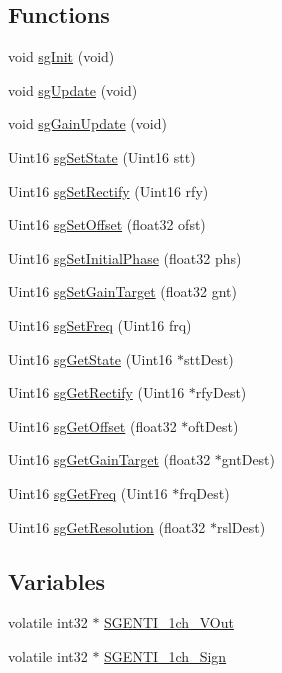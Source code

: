 \subsection*{Functions}
\begin{DoxyCompactItemize}
\item 
void \hyperlink{a00032_a41e810f7181a4ecaa5bc5f0713c6db89}{sg\-Init} (void)
\item 
void \hyperlink{a00032_a4ad7c6eca0c2bcdadaa81dd3fbb9df4b}{sg\-Update} (void)
\item 
void \hyperlink{a00032_a9d1f773315008eac3fc68486f3c9b02a}{sg\-Gain\-Update} (void)
\item 
Uint16 \hyperlink{a00032_a4da3578fed6e04e782a037a270ebde65}{sg\-Set\-State} (Uint16 stt)
\item 
Uint16 \hyperlink{a00032_a663b333309e306b76cc538d8b057ca7d}{sg\-Set\-Rectify} (Uint16 rfy)
\item 
Uint16 \hyperlink{a00032_ac4fa27b2a1e42815c53a9c41aea39dae}{sg\-Set\-Offset} (float32 ofst)
\item 
Uint16 \hyperlink{a00032_ac0b4e573457d4a6e3102c17ec9c3281a}{sg\-Set\-Initial\-Phase} (float32 phs)
\item 
Uint16 \hyperlink{a00032_a1352efb3adb6289a295afa3961d4a352}{sg\-Set\-Gain\-Target} (float32 gnt)
\item 
Uint16 \hyperlink{a00032_a3be6fb433900f4d91074b337ea3dba58}{sg\-Set\-Freq} (Uint16 frq)
\item 
Uint16 \hyperlink{a00032_ab720e3168a284abe388edf230705e4b4}{sg\-Get\-State} (Uint16 $\ast$stt\-Dest)
\item 
Uint16 \hyperlink{a00032_a2257f55d8be03a940f80091c77b70b59}{sg\-Get\-Rectify} (Uint16 $\ast$rfy\-Dest)
\item 
Uint16 \hyperlink{a00032_a56832d4be61bfbb6263eef6100515365}{sg\-Get\-Offset} (float32 $\ast$oft\-Dest)
\item 
Uint16 \hyperlink{a00032_aaf39e7e31c43b94af71863a1ca3c5704}{sg\-Get\-Gain\-Target} (float32 $\ast$gnt\-Dest)
\item 
Uint16 \hyperlink{a00032_a927bad9dd75bf9372d0becfe714a66c7}{sg\-Get\-Freq} (Uint16 $\ast$frq\-Dest)
\item 
Uint16 \hyperlink{a00032_ad625f20b4e4f394215e615071b9217b0}{sg\-Get\-Resolution} (float32 $\ast$rsl\-Dest)
\end{DoxyCompactItemize}
\subsection*{Variables}
\begin{DoxyCompactItemize}
\item 
volatile int32 $\ast$ \hyperlink{a00032_a5dba1fe543c9e62ef6cc8cf4179de951}{S\-G\-E\-N\-T\-I\-\_\-1ch\-\_\-\-V\-Out}
\item 
volatile int32 $\ast$ \hyperlink{a00032_a5369a96cf47ea2fbd84a92ed4091b48b}{S\-G\-E\-N\-T\-I\-\_\-1ch\-\_\-\-Sign}
\end{DoxyCompactItemize}


